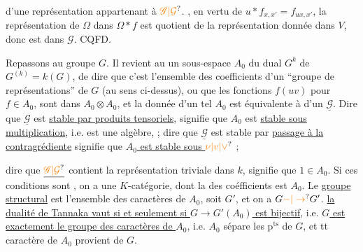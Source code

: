 d'une représentation  appartenant à $\unsure{\mathscr G|\mathcal G}$. ,
en vertu de $u*f_{x,x'}=f_{ux,x'}$, 
la représentation de $\Omega$ dans $\Omega*f$ est quotient
de la représentation donnée dans $V$, donc est
dans $\mathscr G$. CQFD.


Repassons au groupe $G$.  Il
revient au   un sous-espace $A_0$
du  dual $G^k$ de $G^{(k)}=k(G)$, de
dire que c'est l'ensemble des coefficients
d'un ``groupe de représentations''  de $G$
(au sens ci-dessus), ou que les
fonctions $f(uv)$  pour $f\in A_0$, sont dans
$A_0\otimes A_0$, et la donnée d'un tel $A_0$
est équivalente à  d'un $\underline{\mathscr G}$.
 Dire que $\underline{\mathscr G}$ est
\uline{stable par produits tensoriels}, signifie
que $A_0$ est \uline{stable sous multiplication},
i.e. est une algèbre,  ; dire que
$\underline{\mathscr G}$ est stable par \uline{passage à la contragrédiente}
signifie que \uline{$A_0$ est stable sous $\unsure{\nu|v|\vee}$} ;

dire que $\underline{\unsure{\mathscr G|\mathcal G}}$ contient la représentation triviale dans $k$,
signifie que $1\in A_0$.  Si 
ces conditions sont ,   on a une
$K$-catégorie, dont la   des coéfficients est
$A_0$. Le \uline{groupe structural} est  l'ensemble des
caractères de $A_0$, soit $G'$, et on a $G\unsure{-|\to}G'$.
  \uline{la dualité de Tannaka vaut si et
seulement si $G\to G'(A_0)$ est bijectif},
i.e. \uline{$G$ est exactement le groupe des
caractères de $A_0$}, i.e. $A_0$ sépare les $\mathrm p^{\mathrm{ts}}$
de $G$, et tt caractère de $A_0$ provient de $G$.


